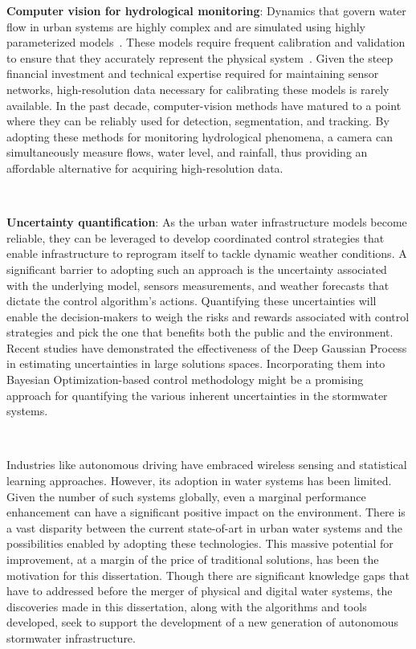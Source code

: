 \textbf{Computer vision for hydrological monitoring}: Dynamics that govern water flow in urban systems are highly complex and are simulated using highly parameterized models~\cite{Rossman2010Storm5.1}.
These models require frequent calibration and validation to ensure that they accurately represent the physical system~\cite{Rossman2010Storm5.1, national2009urban}.
Given the steep financial investment and technical expertise required for maintaining sensor networks, high-resolution data necessary for calibrating these models is rarely available\cite{kerkez2016, Bartos_2018}.
In the past decade, computer-vision methods have matured to a point where they can be reliably used for detection, segmentation, and tracking\cite{LeCun2015DeepLearning}.
By adopting these methods for monitoring hydrological phenomena, a camera can simultaneously measure flows, water level, and rainfall, thus providing an affordable alternative for acquiring high-resolution data.

\

\textbf{Uncertainty quantification}: As the urban water infrastructure models become reliable, they can be leveraged to develop coordinated control strategies that enable infrastructure to reprogram itself to tackle dynamic weather conditions\cite{Mullapudi_Lewis_Gruden_Kerkez_2020}.
A significant barrier to adopting such an approach is the uncertainty associated with the underlying model, sensors measurements, and weather forecasts that dictate the control algorithm's actions.
Quantifying these uncertainties will enable the decision-makers to weigh the risks and rewards associated with control strategies and pick the one that benefits both the public and the environment\cite{sadler2019}.
Recent studies have demonstrated the effectiveness of the Deep Gaussian Process in estimating uncertainties in large solutions spaces\cite{damianou2013deep}.
Incorporating them into Bayesian Optimization-based control methodology might be a promising approach for quantifying the various inherent uncertainties in the stormwater systems.

\

Industries like autonomous driving have embraced wireless sensing and statistical learning approaches.
However, its adoption in water systems has been limited. Given the number of such systems globally, even a marginal performance enhancement can have a significant positive impact on the environment.
There is a vast disparity between the current state-of-art in urban water systems and the possibilities enabled by adopting these technologies.
This massive potential for improvement, at a margin of the price of traditional solutions, has been the motivation for this dissertation.
Though there are significant knowledge gaps that have to addressed before the merger of physical and digital water systems, the discoveries made in this dissertation, along with the algorithms and tools developed, seek to support the development of a new generation of autonomous stormwater infrastructure.
